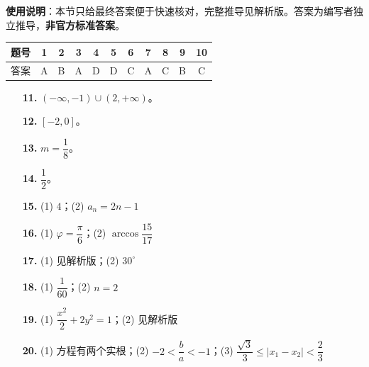 
\begin{gknotice}
\textbf{使用说明}：本节只给最终答案便于快速核对，完整推导见解析版。答案为编写者独立推导，\textbf{非官方标准答案}。
\end{gknotice}

\begin{center}\begin{tabular}{ccccccccccc}
\toprule
题号 & 1 & 2 & 3 & 4 & 5 & 6 & 7 & 8 & 9 & 10 \\
\midrule
答案 & A & B & A & D & D & C & A & C & B & C \\
\bottomrule
\end{tabular}\end{center}

\begin{itemize}[leftmargin=2.6em]
  \item[\textbf{11.}] $(-\infty,-1)\cup(2,+\infty)$。
  \item[\textbf{12.}] $[-2,0]$。
  \item[\textbf{13.}] $m=\dfrac18$。
  \item[\textbf{14.}] $\dfrac12$。
\end{itemize}

\begin{itemize}[leftmargin=2.6em]
  \item[\textbf{15.}] (1) $4$；(2) $a_n=2n-1$
  \item[\textbf{16.}] (1) $\varphi=\dfrac\pi6$；(2) $\arccos\dfrac{15}{17}$
  \item[\textbf{17.}] (1) 见解析版；(2) $30^\circ$
  \item[\textbf{18.}] (1) $\dfrac1{60}$；(2) $n=2$
  \item[\textbf{19.}] (1) $\dfrac{x^2}{2}+2y^2=1$；(2) 见解析版
  \item[\textbf{20.}] (1) 方程有两个实根；(2) $-2<\dfrac ba<-1$；(3) $\dfrac{\sqrt3}{3}\leqslant|x_1-x_2|<\dfrac23$
\end{itemize}
